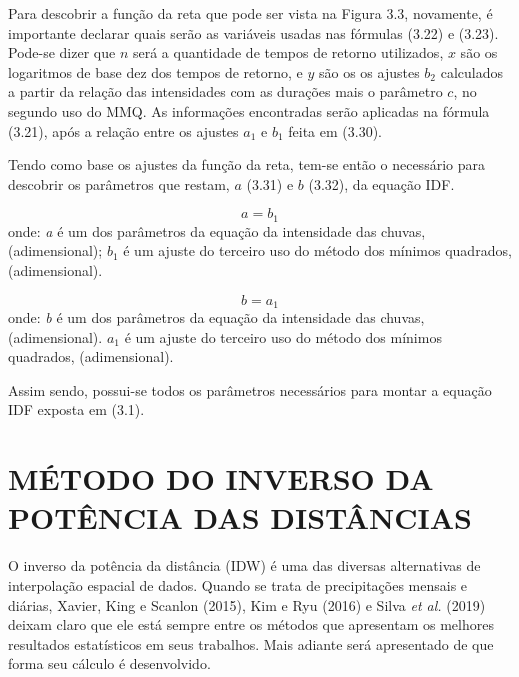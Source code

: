 \newpage

Para descobrir a função da reta que pode ser vista na Figura 3.3, novamente, é importante declarar quais serão as variáveis usadas nas fórmulas (3.22) e (3.23). Pode-se dizer que $n$ será a quantidade de tempos de retorno utilizados, $x$ são os logaritmos de base dez dos tempos de retorno, e $y$ são os os ajustes $b_2$ calculados a partir da relação das intensidades com as durações mais o parâmetro $c$, no segundo uso do MMQ. As informações encontradas serão aplicadas na fórmula (3.21), após a relação entre os ajustes $a_1$ e $b_1$ feita em (3.30).

Tendo como base os ajustes da função da reta, tem-se então o necessário para descobrir os parâmetros que restam, $a$ (3.31) e $b$ (3.32), da equação IDF.\bigskip

\begin{equation}
a = b_1
\end{equation}
\newline
onde:
\newline
\textit{a} é um dos parâmetros da equação da intensidade das chuvas, (adimensional);
\newline
$b_1$ é um ajuste do terceiro uso do método dos mínimos quadrados, (adimensional).\bigskip

\begin{equation}
b = a_1
\end{equation}
\newline
onde:
\newline
\textit{b} é um dos parâmetros da equação da intensidade das chuvas, (adimensional).
\newline
$a_1$ é um ajuste do terceiro uso do método dos mínimos quadrados, (adimensional).\bigskip

Assim sendo, possui-se todos os parâmetros necessários para montar a equação IDF exposta em (3.1).

\newpage

\section{MÉTODO DO INVERSO DA POTÊNCIA DAS DISTÂNCIAS}\bigskip

O inverso da potência da distância (IDW) é uma das diversas alternativas de interpolação espacial de dados. Quando se trata de precipitações mensais e diárias, Xavier, King e Scanlon (2015), Kim e Ryu (2016) e Silva \textit{et al.} (2019) deixam claro que ele está sempre entre os métodos que apresentam os melhores resultados estatísticos em seus trabalhos. Mais adiante será apresentado de que forma seu cálculo é desenvolvido.\bigskip

